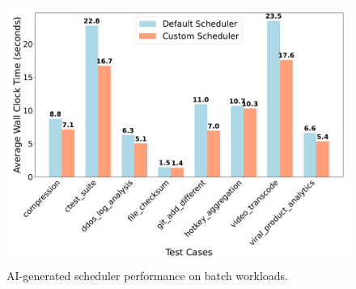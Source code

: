 \begin{figure}[h]
\centering
\includegraphics[width=0.9\columnwidth]{sections/scheduler_performance_comparison.pdf}
\caption{AI-generated scheduler performance on batch workloads.}
\label{fig:batch-performance}
\end{figure}


